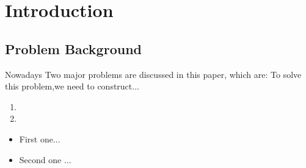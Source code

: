 \section{Introduction}        
\subsection{Problem Background}%
Nowadays 
Two major problems are discussed in this paper, which are:
To solve this problem,we need to construct...
\begin{enumerate}[\quad\bf1.]  %
    \item 
    \item 
\end{enumerate}
\begin{itemize}                %
    \item First one...
    \item Second one ...
\end{itemize}
    \paragraph{}               %
    \subparagraph{}            %


